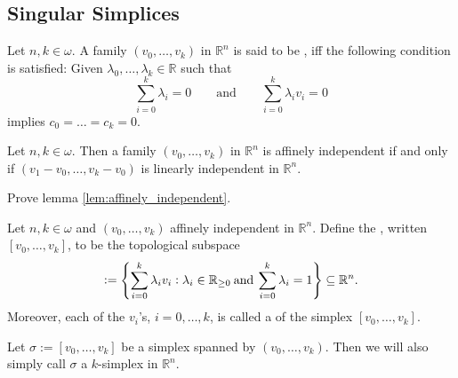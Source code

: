 \subsection*{Singular Simplices}

\begin{definition}
	Let $n,k \in \omega$. A family $(v_0,\dots,v_k)$ in $\mathbb{R}^n$ is said to be , iff the following condition is satisfied: Given $\lambda_0,\dots,\lambda_k \in \mathbb{R}$ such that
	\begin{equation*}
		\sum_{i = 0}^k \lambda_i = 0 \qquad \text{and} \qquad \sum_{i = 0}^k \lambda_i v_i = 0
	\end{equation*}
	\noindent implies $c_0 = \dots = c_k = 0$.
\end{definition}

\begin{lemma}
	\label{lem:affinely_independent}
	Let $n,k \in \omega$. Then a family $(v_0,\dots,v_k)$ in $\mathbb{R}^n$ is affinely independent if and only if $(v_1 - v_0,\dots,v_k - v_0)$ is linearly independent in $\mathbb{R}^n$.
\end{lemma}

\begin{exercise}
	\label{ex:affinely_independent}
	Prove lemma \ref{lem:affinely_independent}.
\end{exercise}

\begin{definition}[Simplex]
	\label{def:simplex}
	Let $n,k \in \omega$ and $(v_0,\dots,v_k)$ affinely independent in $\mathbb{R}^n$. Define the , written $[v_0,\dots,v_k]$, to be the topological subspace 
	\begin{equation*}
		[v_0,\dots,v_k] := \cbr[4]{\sum_{i = 0}^k \lambda_i v_i : \lambda_i \in \mathbb{R}_{\geq 0} \> \text{and} \> \sum_{i = 0}^k \lambda_i = 1} \subseteq \mathbb{R}^n.
	\end{equation*}
	Moreover, each of the $v_i$'s, $i = 0,\dots,k$, is called a  of the simplex $[v_0,\dots,v_k]$.
\end{definition}

\begin{remark}
	Let $\sigma := [v_0,\dots,v_k]$ be a simplex spanned by $(v_0,\dots,v_k)$. Then we will also simply call $\sigma$ a $k$-simplex in $\mathbb{R}^n$.
\end{remark}

